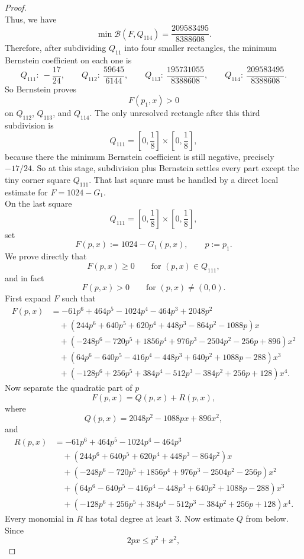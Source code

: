 \documentclass[10pt,a4paper]{amsart}
\begin{document}
\begin{proof}
\[\]
Thus, we have
\[
\min \mathcal B(F,Q_{114})=\frac{209583495}{8388608}.
\]
Therefore, after subdividing \(Q_{11}\) into four smaller rectangles, the minimum Bernstein coefficient on each one is
\[
Q_{111}:\ -\frac{17}{24},\qquad
Q_{112}:\ \frac{59645}{6144},\qquad
Q_{113}:\ \frac{195731055}{8388608},\qquad
Q_{114}:\ \frac{209583495}{8388608}.
\]
So Bernstein proves
\[
F(p_1,x)>0
\]
on \(Q_{112}\), \(Q_{113}\), and \(Q_{114}\).
The only unresolved rectangle after this third subdivision is
\[
Q_{111}=\left[0,\frac18\right]\times\left[0,\frac18\right],
\]
because there the minimum Bernstein coefficient is still negative, precisely
$
-{17}/{24}.
$
So at this stage, subdivision plus Bernstein settles every part except the tiny corner square \(Q_{111}\). That last square must be handled by a direct local estimate for \(F=1024-G_1\).\\[2mm]
On the last square
\[
Q_{111}=\left[0,\frac18\right]\times\left[0,\frac18\right],
\]
set
\[
F(p,x):=1024-G_1(p,x), \qquad p:=p_1.
\]
We prove directly that
\[
F(p,x)\ge 0 \qquad \text{for } (p,x)\in Q_{111},
\]
and in fact
\[
F(p,x)>0 \qquad \text{for } (p,x)\neq(0,0).
\]
First expand $F$ such that 
\[
\begin{aligned}
	F(p,x)
	&=-61p^6+464p^5-1024p^4-464p^3+2048p^2 \\
	&\quad+\left(244p^6+640p^5+620p^4+448p^3-864p^2-1088p\right)x \\
	&\quad+\left(-248p^6-720p^5+1856p^4+976p^3-2504p^2-256p+896\right)x^2 \\
	&\quad+\left(64p^6-640p^5-416p^4-448p^3+640p^2+1088p-288\right)x^3 \\
	&\quad+\left(-128p^6+256p^5+384p^4-512p^3-384p^2+256p+128\right)x^4.
\end{aligned}
\]
Now separate the quadratic part of $p$
\[
F(p,x)=Q(p,x)+R(p,x),
\]
where
\[
Q(p,x)=2048p^2-1088px+896x^2,
\]
and
\[
\begin{aligned}
	R(p,x)
	&=-61p^6+464p^5-1024p^4-464p^3 \\
	&\quad+\left(244p^6+640p^5+620p^4+448p^3-864p^2\right)x \\
	&\quad+\left(-248p^6-720p^5+1856p^4+976p^3-2504p^2-256p\right)x^2 \\
	&\quad+\left(64p^6-640p^5-416p^4-448p^3+640p^2+1088p-288\right)x^3 \\
	&\quad+\left(-128p^6+256p^5+384p^4-512p^3-384p^2+256p+128\right)x^4.
\end{aligned}
\]
Every monomial in \(R\) has total degree at least \(3\).
Now estimate \(Q\) from below. Since
\[
2px\le p^2+x^2,
\]
\end{proof}
\end{document}
